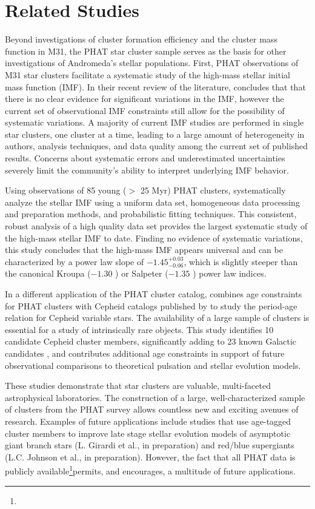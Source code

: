 \section{Related Studies}\label{MPSection:D79D1D8E-69FE-45FA-841B-F50E8FFC8E95}

Beyond investigations of cluster formation efficiency and the cluster mass function in M31, the PHAT star cluster sample serves as the basis for other investigations of Andromeda's stellar populations. First, PHAT observations of M31 star clusters facilitate a systematic study of the high-mass stellar initial mass function (IMF). In their recent review of the literature, concludes that that there is no clear evidence for significant variations in the IMF, however the current set of observational IMF constraints still allow for the possibility of systematic variations. A majority of current IMF studies are performed in single star clusters, one cluster at a time, leading to a large amount of heterogeneity in authors, analysis techniques, and data quality among the current set of published results. Concerns about systematic errors and underestimated uncertainties severely limit the community's ability to interpret underlying IMF behavior.

Using observations of 85 young ($>$ 25 Myr) PHAT clusters, systematically analyze the stellar IMF using a uniform data set, homogeneous data processing and preparation methods, and probabilistic fitting techniques. This consistent, robust analysis of a high quality data set provides the largest systematic study of the high-mass stellar IMF to date. Finding no evidence of systematic variations, this study concludes that the high-mass IMF appears universal and can be characterized by a power law slope of $-1.45^{+0.03}_{-0.06}$, which is slightly steeper than the canonical Kroupa ($-1.30$ ) or Salpeter ($-1.35$ ) power law indices.

In a different application of the PHAT cluster catalog, combines age constraints for PHAT clusters with Cepheid catalogs published by to study the period-age relation for Cepheid variable stars. The availability of a large sample of clusters is essential for a study of intrinsically rare objects. This study identifies 10 candidate Cepheid cluster members, significantly adding to 23 known Galactic candidates , and contributes additional age constraints in support of future observational comparisons to theoretical pulsation and stellar evolution models.

These studies demonstrate that star clusters are valuable, multi-faceted astrophysical laboratories. The construction of a large, well-characterized sample of clusters from the PHAT survey allows countless new and exciting avenues of research. Examples of future applications include studies that use age-tagged cluster members to improve late stage stellar evolution models of asymptotic giant branch stars (L. Girardi et al., in preparation) and red\slash blue supergiants (L.C. Johnson et al., in preparation). However, the fact that all PHAT data is publicly available\footnote{}permits, and encourages, a multitude of future applications.


